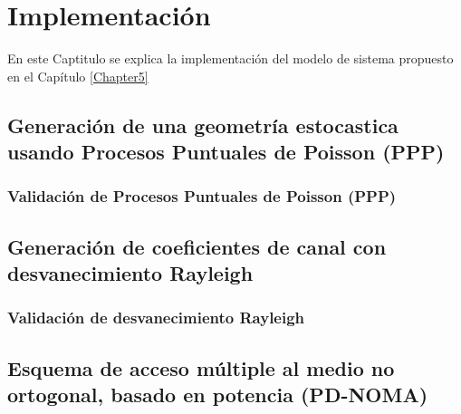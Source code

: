 
\chapter{Implementación} %

\label{Chapter6} %

En este Captitulo se explica la implementación del modelo de sistema propuesto en el Capítulo \ref{Chapter5}
\newline


\section{Generación de una geometría estocastica usando Procesos Puntuales de Poisson (PPP)}

\subsection{Validación de Procesos Puntuales de Poisson (PPP)}



\section{Generación de coeficientes de canal con desvanecimiento Rayleigh}

\subsection{Validación de desvanecimiento Rayleigh}



\section{Esquema de acceso múltiple al medio no ortogonal, basado en potencia (PD-NOMA)}
